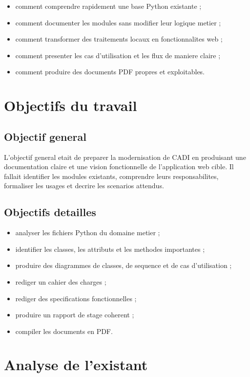 \documentclass[11pt,a4paper]{report}
\begin{document}
\begin{itemize}
  \item comment comprendre rapidement une base Python existante ;
  \item comment documenter les modules sans modifier leur logique metier ;
  \item comment transformer des traitements locaux en fonctionnalites web ;
  \item comment presenter les cas d'utilisation et les flux de maniere claire ;
  \item comment produire des documents PDF propres et exploitables.
\end{itemize}

\chapter{Objectifs du travail}

\section{Objectif general}

L'objectif general etait de preparer la modernisation de CADI en produisant une documentation claire et une vision fonctionnelle de l'application web cible. Il fallait identifier les modules existants, comprendre leurs responsabilites, formaliser les usages et decrire les scenarios attendus.

\section{Objectifs detailles}

\begin{itemize}
  \item analyser les fichiers Python du domaine metier ;
  \item identifier les classes, les attributs et les methodes importantes ;
  \item produire des diagrammes de classes, de sequence et de cas d'utilisation ;
  \item rediger un cahier des charges ;
  \item rediger des specifications fonctionnelles ;
  \item produire un rapport de stage coherent ;
  \item compiler les documents en PDF.
\end{itemize}

\chapter{Analyse de l'existant}
\end{document}
